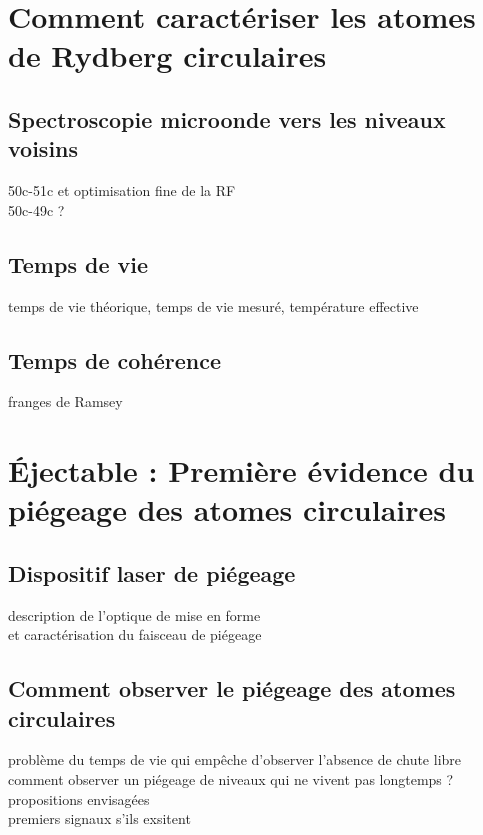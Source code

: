 \section{Comment caractériser les atomes de Rydberg circulaires}
	\subsection{Spectroscopie microonde vers les niveaux voisins}
		\noindent 50c-51c et optimisation fine de la RF\\
		\noindent 50c-49c ?
	\subsection{Temps de vie}
		\noindent temps de vie théorique, temps de vie mesuré, température effective
	\subsection{Temps de cohérence}
		\noindent franges de Ramsey
	


\section{Éjectable : Première évidence du piégeage des atomes circulaires}
	\subsection{Dispositif laser de piégeage}
		\noindent description de l'optique de mise en forme \\
		et caractérisation du faisceau de piégeage
	\subsection{Comment observer le piégeage des atomes circulaires}
		\noindent problème du temps de vie qui empêche d'observer l'absence de chute libre \\
		\noindent comment observer un piégeage de niveaux qui ne vivent pas longtemps ? propositions envisagées\\
		premiers signaux s'ils exsitent
